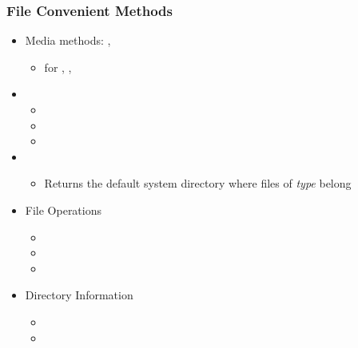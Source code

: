 \begin{slide}\frametitle{File Convenient Methods}
  \begin{itemize}
  \item Media methods: , 
    \begin{itemize}
    \item for , , 
    \end{itemize}
  \item {}
    \begin{itemize}
    \item {}
    \item {}
    \item {}
    \end{itemize}
  \item {}
    \begin{itemize}
    \item Returns the default system directory where files of \textit{type} belong
    \end{itemize}
  \item File Operations
    \begin{itemize}
    \item {}
    \item {}
    \item {}
    \end{itemize}
  \item Directory Information
    \begin{itemize}
    \item {}
    \item {}
    \end{itemize}
  \end{itemize}
\end{slide}

